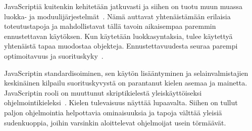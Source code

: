 JavaScriptiä kuitenkin kehitetään jatkuvasti ja siihen on tuotu muun muassa luokka- ja moduulijärjestelmät~\cite[14.5.~ja~15.2.]{es6}. Nämä auttavat yhtenäistämään erilaisia toteutustapoja ja mahdollistavat tällä tavoin aikaisempaa paremmin ennustettavan käytöksen. Kun käytetään luokkasyntaksia, tulee käytettyä yhtenäistä tapaa muodostaa objekteja. Ennustettavuudesta seuraa parempi optimoitavuus ja suorituskyky~\cite[s.~497]{Ahn2014}.

JavaScriptin standardisoiminen, sen käytön lisääntyminen ja selainvalmistajien keskinäinen kilpailu suorituskyvystä on parantanut kielen asemaa ja mainetta. JavaScriptin rooli on muuttunut skriptikielestä yleiskäyttöiseksi ohjelmointikieleksi~\cite[4.]{es6}. Kielen tulevaisuus näyttää lupaavalta. Siihen on tullut paljon ohjelmointia helpottavia ominaisuuksia ja tapoja välttää yleisiä sudenkuoppia, joihin varsinkin aloittelevat ohjelmoijat usein törmäävät.